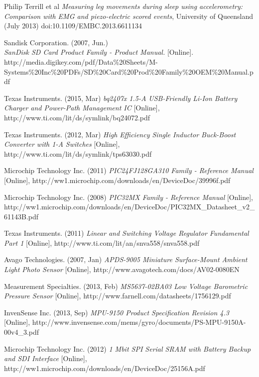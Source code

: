 \documentclass[12pt,openany,a4paper]{book}
\begin{document}
\begin{thebibliography}{99}
	Philip Terrill et al
	\emph{Measuring leg movements during sleep using accelerometry: Comparison with EMG and piezo-electric scored events},
	University of Queensland (July 2013) doi:10.1109/EMBC.2013.6611134
	
	Sandisk Corporation. (2007, Jun.) \\
	\emph{SanDisk SD Card Product Family - Product Manual.} [Online].\\ http://media.digikey.com/pdf/Data\%20Sheets/M-Systems\%20Inc\%20PDFs/SD\%20Card\%20Prod\%20Family\%20OEM\%20Manual.pdf
	
	Texas Instruments. (2015, Mar) \emph{bq2407x 1.5-A USB-Friendly Li-Ion Battery Charger and Power-Path Management IC} [Online],
	http://www.ti.com/lit/ds/symlink/bq24072.pdf
	
	Texas Instruments. (2012, Mar) 
	\emph{High Efficiency Single Inductor Buck-Boost Converter with 1-A Switches} [Online],
	http://www.ti.com/lit/ds/symlink/tps63030.pdf
	
	Microchip Technology Inc. (2011) 
	\emph{PIC24FJ128GA310 Family - Reference Manual} [Online],
	http://ww1.microchip.com/downloads/en/DeviceDoc/39996f.pdf
	
	Microchip Technology Inc. (2008)
	\emph{PIC32MX Family - Reference Manual} [Online], http://ww1.microchip.com/downloads/en/DeviceDoc/PIC32MX\_Datasheet\_v2\_61143B.pdf
	
	Texas Instruments. (2011)
	\emph{Linear and Switching Voltage Regulator Fundamental Part 1} [Online], http://www.ti.com/lit/an/snva558/snva558.pdf
	
	Avago Technologies. (2007, Jan) 
	\emph{APDS-9005 Miniature Surface-Mount Ambient Light Photo Sensor} [Online],
	http://www.avagotech.com/docs/AV02-0080EN
	
	Measurement Specialties. (2013, Feb)
	\emph{MS5637-02BA03 Low Voltage Barometric Pressure Sensor}
	[Online],
	http://www.farnell.com/datasheets/1756129.pdf
	
	InvenSense Inc. (2013, Sep)
	\emph{MPU-9150 Product Specification Revision 4.3} [Online],
	http://www.invensense.com/mems/gyro/documents/PS-MPU-9150A-00v4\_3.pdf
	
	Microchip Technology Inc. (2012)
	\emph{1 Mbit SPI Serial SRAM with Battery Backup and SDI Interface} [Online],
	http://ww1.microchip.com/downloads/en/DeviceDoc/25156A.pdf
	

\end{thebibliography}
\end{document}
